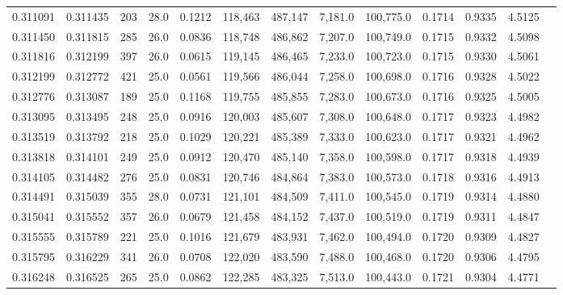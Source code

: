 \begin{tabular}{rrrrrrrrrrrrr}
0.311091 & 0.311435 &   203 & 28.0 &                                     0.1212 & 118,463 & 487,147 &   7,181.0 & 100,775.0 & 0.1714 & 0.9335 & 4.5125 \\
0.311450 & 0.311815 &   285 & 26.0 &                                     0.0836 & 118,748 & 486,862 &   7,207.0 & 100,749.0 & 0.1715 & 0.9332 & 4.5098 \\
0.311816 & 0.312199 &   397 & 26.0 &                                     0.0615 & 119,145 & 486,465 &   7,233.0 & 100,723.0 & 0.1715 & 0.9330 & 4.5061 \\
0.312199 & 0.312772 &   421 & 25.0 &                                     0.0561 & 119,566 & 486,044 &   7,258.0 & 100,698.0 & 0.1716 & 0.9328 & 4.5022 \\
0.312776 & 0.313087 &   189 & 25.0 &                                     0.1168 & 119,755 & 485,855 &   7,283.0 & 100,673.0 & 0.1716 & 0.9325 & 4.5005 \\
0.313095 & 0.313495 &   248 & 25.0 &                                     0.0916 & 120,003 & 485,607 &   7,308.0 & 100,648.0 & 0.1717 & 0.9323 & 4.4982 \\
0.313519 & 0.313792 &   218 & 25.0 &                                     0.1029 & 120,221 & 485,389 &   7,333.0 & 100,623.0 & 0.1717 & 0.9321 & 4.4962 \\
0.313818 & 0.314101 &   249 & 25.0 &                                     0.0912 & 120,470 & 485,140 &   7,358.0 & 100,598.0 & 0.1717 & 0.9318 & 4.4939 \\
0.314105 & 0.314482 &   276 & 25.0 &                                     0.0831 & 120,746 & 484,864 &   7,383.0 & 100,573.0 & 0.1718 & 0.9316 & 4.4913 \\
0.314491 & 0.315039 &   355 & 28.0 &                                     0.0731 & 121,101 & 484,509 &   7,411.0 & 100,545.0 & 0.1719 & 0.9314 & 4.4880 \\
0.315041 & 0.315552 &   357 & 26.0 &                                     0.0679 & 121,458 & 484,152 &   7,437.0 & 100,519.0 & 0.1719 & 0.9311 & 4.4847 \\
0.315555 & 0.315789 &   221 & 25.0 &                                     0.1016 & 121,679 & 483,931 &   7,462.0 & 100,494.0 & 0.1720 & 0.9309 & 4.4827 \\
0.315795 & 0.316229 &   341 & 26.0 &                                     0.0708 & 122,020 & 483,590 &   7,488.0 & 100,468.0 & 0.1720 & 0.9306 & 4.4795 \\
0.316248 & 0.316525 &   265 & 25.0 &                                     0.0862 & 122,285 & 483,325 &   7,513.0 & 100,443.0 & 0.1721 & 0.9304 & 4.4771 \\

\end{tabular}
